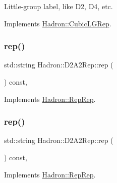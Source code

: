 Little-\/group label, like D2, D4, etc. 

Implements \mbox{\hyperlink{structHadron_1_1CubicLGRep_a9bdb14b519a611d21379ed96a3a9eb41}{Hadron\+::\+Cubic\+L\+G\+Rep}}.

\mbox{\label{structHadron_1_1D2A2Rep_a6820f2acd27e1e6bcebbe430421b0e65}} 
\subsubsection{\texorpdfstring{rep()}{rep()}\hspace{0.1cm}{\footnotesize\ttfamily [1/5]}}
{\footnotesize\ttfamily std\+::string Hadron\+::\+D2\+A2\+Rep\+::rep (\begin{DoxyParamCaption}{ }\end{DoxyParamCaption}) const\hspace{0.3cm}{\ttfamily [inline]}, {\ttfamily [virtual]}}



Implements \mbox{\hyperlink{structHadron_1_1RepRep_ab3213025f6de249f7095892109575fde}{Hadron\+::\+Rep\+Rep}}.

\mbox{\label{structHadron_1_1D2A2Rep_a6820f2acd27e1e6bcebbe430421b0e65}} 
\subsubsection{\texorpdfstring{rep()}{rep()}\hspace{0.1cm}{\footnotesize\ttfamily [2/5]}}
{\footnotesize\ttfamily std\+::string Hadron\+::\+D2\+A2\+Rep\+::rep (\begin{DoxyParamCaption}{ }\end{DoxyParamCaption}) const\hspace{0.3cm}{\ttfamily [inline]}, {\ttfamily [virtual]}}



Implements \mbox{\hyperlink{structHadron_1_1RepRep_ab3213025f6de249f7095892109575fde}{Hadron\+::\+Rep\+Rep}}.

\mbox{\label{structHadron_1_1D2A2Rep_a6820f2acd27e1e6bcebbe430421b0e65}} 
